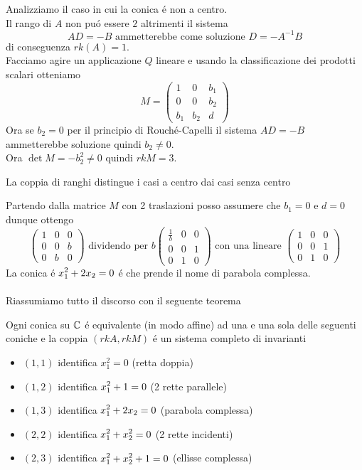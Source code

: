 Analizziamo il  caso in cui la conica \'e non a centro.\\
Il rango di $A$ non pu\'o essere $2$ altrimenti il sistema 
$$ AD = -B \text{ ammetterebbe come soluzione } D = - A^{-1}B $$
di conseguenza $rk(A)=1 $.\\
Facciamo agire un applicazione $Q$ lineare e usando la classificazione dei prodotti scalari otteniamo
$$M=\left(  \begin{array}{cc|c }1 & 0 & b_1 \\ 0 & 0 & b_2 \\ \hline b_1 & b_2 & d 
\end{array}\right)$$
Ora se $b_2=0 $ per il principio di Rouch\'e-Capelli il sistema $AD=-B$ ammetterebbe soluzione quindi $b_2 \neq 0 $.\\
Ora $\det M = -b_2^2 \neq 0$ quindi $rk M =3$.\\
\begin{oss}La coppia di ranghi distingue i casi a centro dai casi senza centro
\end{oss}
Partendo dalla matrice $M$ con 2 traslazioni posso assumere che $b_1=0 $ e $d=0$ dunque ottengo
$$\left(  \begin{array}{cc|c }1 & 0 & 0 \\ 0 & 0 & b \\ \hline 0 & b & 0
\end{array}\right) \text{ dividendo per } b \left(  \begin{array}{cc|c }\frac{1}{b} & 0 & 0 \\ 0 & 0 & 1 \\ \hline 0 & 1 & 0
\end{array}\right) \text{ con una lineare } \left(  \begin{array}{cc|c }1 & 0 & 0 \\ 0 & 0 & 1 \\ \hline 0 & 1 & 0
\end{array}\right)$$
La conica \'e $ \displaystyle x_1^2+2x_2=0$ \'e che prende il nome di parabola complessa.\\ \\
Riassumiamo tutto il discorso con il seguente teorema
\begin{thm}\bianco
Ogni conica su $\mathbb{C}$ \'e equivalente (in modo affine) ad una e una sola delle seguenti coniche  e la coppia $(rk A, rk M)$ \'e un sistema completo di invarianti
\begin{itemize}
\item $(1,1) $ identifica $ \displaystyle x_1^2 =0$ (retta doppia)
\item$(1,2)$ identifica $ \displaystyle x_1^2 +1 =0$ (2 rette parallele)
\item $(1,3)$ identifica $\displaystyle x_1^2 +2x_2=0$ (parabola complessa)
\item $(2,2)$ identifica $\displaystyle x_1^2+x_2^2 =0$ (2 rette incidenti)
\item $(2,3)$ identifica $\displaystyle x_1^2+x_2^2+1=0$ (ellisse complessa)
\end{itemize}
\end{thm}
\newpage
